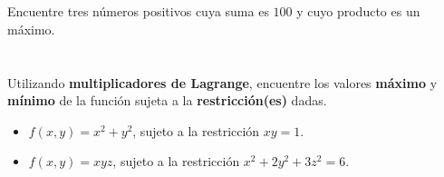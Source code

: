 \documentclass[12pt]{article}
\begin{document}
\section{}

Encuentre tres números positivos cuya suma es $100$ y cuyo producto es un máximo.

\section{}

Utilizando \textbf{multiplicadores de Lagrange}, encuentre los valores \textbf{máximo} y \textbf{mínimo} de la función sujeta a la \textbf{restricción(es)} dadas.

\begin{itemize}[format=\textbf]

\item $f(x, y) = x^2 + y^2$, sujeto a la restricción $xy = 1$.

\item $f(x, y) = xyz$, sujeto a la restricción $x^2 + 2y^2 + 3z^2 = 6$.
  
\end{itemize}
\end{document}
